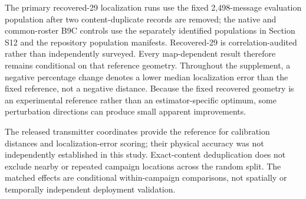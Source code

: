 \documentclass[journal,onecolumn,10pt]{IEEEtran}
\begin{document}
The primary recovered-29 localization runs use the fixed 2,498-message evaluation population after two content-duplicate records are removed; the native and common-roster B9C controls use the separately identified populations in Section S12 and the repository population manifests. Recovered-29 is correlation-audited rather than independently surveyed. Every map-dependent result therefore remains conditional on that reference geometry. Throughout the supplement, a negative percentage change denotes a lower median localization error than the fixed reference, not a negative distance. Because the fixed recovered geometry is an experimental reference rather than an estimator-specific optimum, some perturbation directions can produce small apparent improvements.

The released transmitter coordinates provide the reference for calibration distances and localization-error scoring; their physical accuracy was not independently established in this study. Exact-content deduplication does not exclude nearby or repeated campaign locations across the random split. The matched effects are conditional within-campaign comparisons, not spatially or temporally independent deployment validation.
\end{document}
